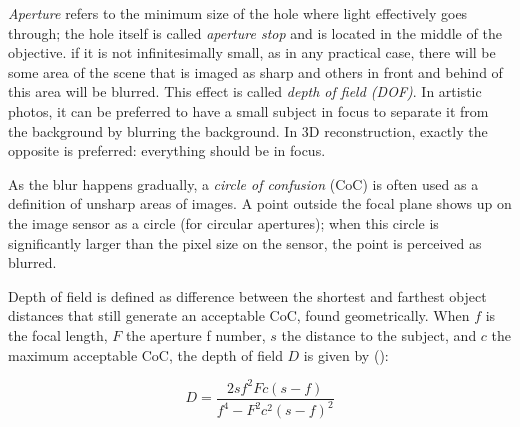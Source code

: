

\emph{Aperture} refers to the minimum size of the hole where light effectively goes through; the hole itself is called \emph{aperture stop} and is located in the middle of the objective.
if it is not infinitesimally small, as in any practical case, there will be some area of the scene that is imaged as sharp and others in front and behind of this area will be blurred.
This effect is called \emph{depth of field (DOF)}.
In artistic photos, it can be preferred to have a small subject in focus to separate it from the background by blurring the background.
In 3D reconstruction, exactly the opposite is preferred: everything should be in focus.

As the blur happens gradually, a \emph{circle of confusion} (CoC) is often used as a definition of unsharp areas of images.
A point outside the focal plane shows up on the image sensor as a circle (for circular apertures); when this circle is significantly larger than the pixel size on the sensor, the point is perceived as blurred.

Depth of field is defined as difference between the shortest and farthest object distances that still generate an acceptable CoC, found geometrically.
When $f$ is the focal length, $F$ the aperture f number, $s$ the distance to the subject, and $c$ the maximum acceptable CoC, the depth of field $D$ is given by (\cite{greenleaf1950photographic}):

\begin{equation} \label{eq:dof}
	D = \frac{2 s f^2 F c (s - f)} {f^4 - F^2 c^2 (s - f)^2}
\end{equation}



